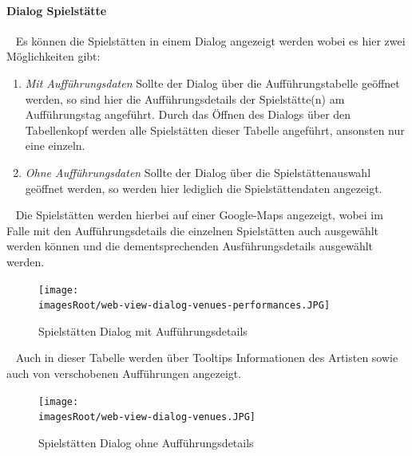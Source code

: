 \documentclass[11pt, a4paper, twoside]{article}   	%
\newcommand{\imagesRoot}{images}
\begin{document}
\paragraph{Dialog Spielstätte}
\ \newline 
Es können die Spielstätten in einem Dialog angezeigt werden wobei es hier zwei Möglichkeiten gibt:
\begin{enumerate}
	\item\emph{Mit Aufführungsdaten}
	\newline
	Sollte der Dialog über die Aufführungstabelle geöffnet werden, so sind hier die Aufführungsdetails der Spielstätte(n) am Aufführungstag angeführt. Durch das Öffnen des Dialogs über den Tabellenkopf werden alle Spielstätten dieser Tabelle angeführt, ansonsten nur eine einzeln. 
	\item\emph{Ohne Aufführungsdaten}
	\newline
	Sollte der Dialog über die Spielstättenauswahl geöffnet werden, so werden hier lediglich die Spielstättendaten angezeigt.
\end{enumerate}
\ \newline
Die Spielstätten werden hierbei auf einer Google-Maps angezeigt, wobei im Falle mit den Aufführungsdetails die einzelnen Spielstätten auch ausgewählt werden können und die dementsprechenden Ausführungsdetails ausgewählt werden.
\begin{figure}[h]
	\centering
	\texttt{[image: \\imagesRoot/web-view-dialog-venues-performances.JPG]}
	\caption
	{Spielstätten Dialog mit Aufführungsdetails}
\end{figure}
\ \newline
Auch in dieser Tabelle werden über Tooltips Informationen des Artisten sowie auch von verschobenen Aufführungen angezeigt.
 \newpage
\begin{figure}[h]
	\centering
	\texttt{[image: \\imagesRoot/web-view-dialog-venues.JPG]}
	\caption
	{Spielstätten Dialog ohne Aufführungsdetails}
\end{figure}
\end{document}
